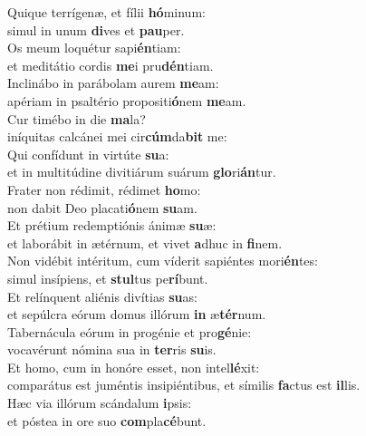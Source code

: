 \evenverse Quique terrígenæ, et fílii \textbf{hó}minum:~\*\\
\evenverse simul in unum \textbf{di}ves et \textbf{pau}per.\\
\oddverse Os meum loquétur sapi\textbf{én}tiam:~\*\\
\oddverse et meditátio cordis \textbf{me}i pru\textbf{dén}tiam.\\
\evenverse Inclinábo in parábolam aurem \textbf{me}am:~\*\\
\evenverse apériam in psaltério propositi\textbf{ó}nem \textbf{me}am.\\
\oddverse Cur timébo in die \textbf{ma}la?~\*\\
\oddverse iníquitas calcánei mei cir\textbf{cúm}da\textbf{bit} me:\\
\evenverse Qui confídunt in virtúte \textbf{su}a:~\*\\
\evenverse et in multitúdine divitiárum suárum \textbf{glo}ri\textbf{án}tur.\\
\oddverse Frater non rédimit, rédimet \textbf{ho}mo:~\*\\
\oddverse non dabit Deo placati\textbf{ó}nem \textbf{su}am.\\
\evenverse Et prétium redemptiónis ánimæ \textbf{su}æ:~\*\\
\evenverse et laborábit in ætérnum, et vivet \textbf{a}dhuc in \textbf{fi}nem.\\
\oddverse Non vidébit intéritum, cum víderit sapiéntes mori\textbf{én}tes:~\*\\
\oddverse simul insípiens, et \textbf{stul}tus pe\textbf{rí}bunt.\\
\evenverse Et relínquent aliénis divítias \textbf{su}as:~\*\\
\evenverse et sepúlcra eórum domus illórum \textbf{in} æ\textbf{tér}num.\\
\oddverse Tabernácula eórum in progénie et pro\textbf{gé}nie:~\*\\
\oddverse vocavérunt nómina sua in \textbf{ter}ris \textbf{su}is.\\
\evenverse Et homo, cum in honóre esset, non intel\textbf{lé}xit:~\*\\
\evenverse comparátus est juméntis insipiéntibus, et símilis \textbf{fa}ctus est \textbf{il}lis.\\
\oddverse Hæc via illórum scándalum \textbf{i}psis:~\*\\
\oddverse et póstea in ore suo \textbf{com}pla\textbf{cé}bunt.\\
